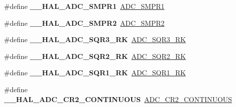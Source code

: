 \begin{DoxyCompactItemize}
\item 
\mbox{\label{group___h_a_l___a_d_c___aliased___macros_gad8e081521ef7ee963c7833376f52dbfd}} 
\#define {\bfseries \+\_\+\+\_\+\+H\+A\+L\+\_\+\+A\+D\+C\+\_\+\+S\+M\+P\+R1}~\hyperlink{group___a_d_c___private___macros_ga29f7414128fbbdb81db6ea6ede449f4b}{A\+D\+C\+\_\+\+S\+M\+P\+R1}
\item 
\mbox{\label{group___h_a_l___a_d_c___aliased___macros_gabd50880ede02b19440d1dbc549b19e8f}} 
\#define {\bfseries \+\_\+\+\_\+\+H\+A\+L\+\_\+\+A\+D\+C\+\_\+\+S\+M\+P\+R2}~\hyperlink{group___a_d_c___private___macros_gaeb66714538d978d4d336a4a6ef0d58bc}{A\+D\+C\+\_\+\+S\+M\+P\+R2}
\item 
\mbox{\label{group___h_a_l___a_d_c___aliased___macros_ga999c539ac6b3b5ab766461e70dadf0a2}} 
\#define {\bfseries \+\_\+\+\_\+\+H\+A\+L\+\_\+\+A\+D\+C\+\_\+\+S\+Q\+R3\+\_\+\+RK}~\hyperlink{group___a_d_c___private___macros_ga173aa2d3480ddaac12fe6a853bead899}{A\+D\+C\+\_\+\+S\+Q\+R3\+\_\+\+RK}
\item 
\mbox{\label{group___h_a_l___a_d_c___aliased___macros_ga6821ae59c39afefd2644d278974b2ab6}} 
\#define {\bfseries \+\_\+\+\_\+\+H\+A\+L\+\_\+\+A\+D\+C\+\_\+\+S\+Q\+R2\+\_\+\+RK}~\hyperlink{group___a_d_c___private___macros_gad07a38a5b6d28f23ecbe027222f59bd0}{A\+D\+C\+\_\+\+S\+Q\+R2\+\_\+\+RK}
\item 
\mbox{\label{group___h_a_l___a_d_c___aliased___macros_ga907ae83ff38403071ff564a44d5ad3cb}} 
\#define {\bfseries \+\_\+\+\_\+\+H\+A\+L\+\_\+\+A\+D\+C\+\_\+\+S\+Q\+R1\+\_\+\+RK}~\hyperlink{group___a_d_c___private___macros_ga89869cd79b14d222a9b235bd150fc512}{A\+D\+C\+\_\+\+S\+Q\+R1\+\_\+\+RK}
\item 
\mbox{\label{group___h_a_l___a_d_c___aliased___macros_ga8b8d36727b15f9d630f633e453c8dc59}} 
\#define {\bfseries \+\_\+\+\_\+\+H\+A\+L\+\_\+\+A\+D\+C\+\_\+\+C\+R2\+\_\+\+C\+O\+N\+T\+I\+N\+U\+O\+US}~\hyperlink{group___a_d_c___private___macros_gae92924f248b2fd7693ce648275a8087c}{A\+D\+C\+\_\+\+C\+R2\+\_\+\+C\+O\+N\+T\+I\+N\+U\+O\+US}
\item 

\end{DoxyCompactItemize}
